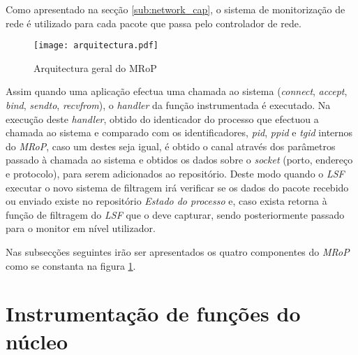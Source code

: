 Como apresentado na secção \ref{sub:network_cap}, o sistema de monitorização de rede é utilizado para cada pacote que passa pelo controlador de rede.

\begin{figure}[ht]
\centering
\texttt{[image: arquitectura.pdf]}
\caption{Arquitectura geral do MRoP}
\label{fig:general_architecture}
\end{figure}

Assim quando uma aplicação efectua uma chamada ao sistema (\textit{connect}, \textit{accept}, \textit{bind}, \textit{sendto}, \textit{recvfrom}), o \textit{handler} da função instrumentada é executado.
Na execução deste \textit{handler}, obtido do identicador do processo que efectuou a chamada ao sistema e comparado com os identificadores, \textit{pid}, \textit{ppid} e \textit{tgid} internos do \textit{MRoP}, caso um destes seja igual, é obtido o canal através dos parâmetros passado à chamada ao sistema e obtidos os dados sobre o \textit{socket} (porto, endereço e protocolo), para serem adicionados ao repositório.
Deste modo quando o \textit{LSF} executar o novo sistema de filtragem irá verificar se os dados do pacote recebido ou enviado existe no repositório \textit{Estado do processo} e, caso exista retorna à função de filtragem do \textit{LSF} que o deve capturar, sendo posteriormente passado para o monitor em nível utilizador.





Nas subsecções seguintes irão ser apresentados os quatro componentes do \textit{MRoP} como se constanta na figura \ref{fig:general_architecture}.


\section{Instrumentação de funções do núcleo}




